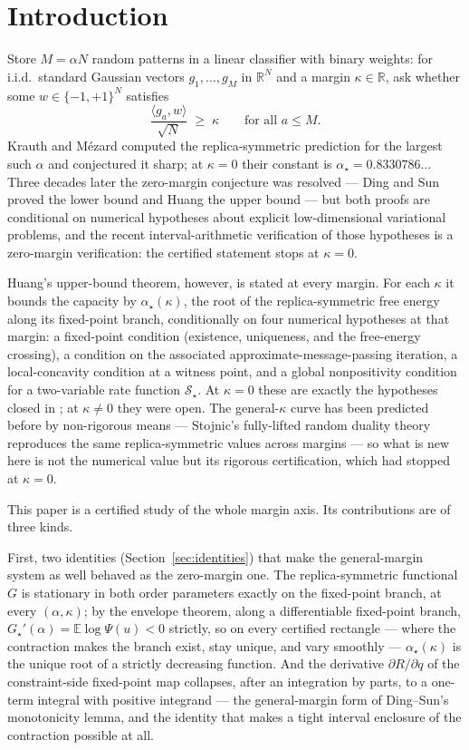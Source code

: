 \documentclass[11pt]{article}
\theoremstyle{remark}
\newcommand{\E}{\mathbb{E}}
\newcommand{\R}{\mathbb{R}}
\newcommand{\sS}{\mathcal{S}}
\begin{document}
\section{Introduction}

Store $M=\alpha N$ random patterns in a linear classifier with binary
weights: for i.i.d.\ standard Gaussian vectors $g_1,\dots,g_M$ in
$\R^N$ and a margin $\kappa\in\R$, ask whether some
$w\in\{-1,+1\}^N$ satisfies
\[
\frac{\langle g_a, w\rangle}{\sqrt N}\;\ge\;\kappa
\qquad\text{for all } a\le M .
\]
Krauth and M\'ezard \cite{krauth1989storage} computed the
replica-symmetric prediction for the largest such $\alpha$ and
conjectured it sharp; at $\kappa=0$ their constant is
$\alpha_\star=0.8330786\ldots$  Three decades later the zero-margin
conjecture was resolved --- Ding and Sun \cite{ding2019capacity}
proved the lower bound and Huang \cite{huang2024capacity} the upper
bound --- but both proofs are conditional on numerical hypotheses
about explicit low-dimensional variational problems, and the recent
interval-arithmetic verification of those hypotheses
\cite{shmalo2026capacity} is a zero-margin verification: the certified
statement stops at $\kappa=0$.

Huang's upper-bound theorem, however, is stated at every margin.  For
each $\kappa$ it bounds the capacity by $\alpha_\star(\kappa)$, the
root of the replica-symmetric free energy along its fixed-point
branch, conditionally on four numerical hypotheses at that margin: a
fixed-point condition (existence, uniqueness, and the free-energy
crossing), a condition on the associated approximate-message-passing
iteration, a local-concavity condition at a witness point, and a
global nonpositivity condition for a two-variable rate function
$\sS_\star$.  At $\kappa=0$ these are exactly the hypotheses closed in
\cite{shmalo2026capacity}; at $\kappa\ne0$ they were open.
The general-$\kappa$ curve has been predicted before by non-rigorous
means --- Stojnic's fully-lifted random duality
theory~\cite{stojnic2023} reproduces the same replica-symmetric
values across margins --- so what is new here is not the numerical
value but its rigorous certification, which had stopped at
$\kappa=0$.

This paper is a certified study of the whole margin axis.  Its
contributions are of three kinds.

First, two identities (Section~\ref{sec:identities}) that make the
general-margin system as well behaved as the zero-margin one.  The
replica-symmetric functional $G$ is stationary in both order
parameters exactly on the fixed-point branch, at every $(\alpha,
\kappa)$; by the envelope theorem, along a differentiable fixed-point
branch, $G_\star'(\alpha)=\E\log\Psi(u)<0$ strictly, so on every
certified rectangle --- where the contraction makes the branch exist,
stay unique, and vary smoothly --- $\alpha_\star(\kappa)$ is the
unique root of a strictly decreasing function.  And the derivative $\partial R/\partial
q$ of the constraint-side fixed-point map collapses, after an
integration by parts, to a one-term integral with positive integrand
--- the general-margin form of Ding--Sun's monotonicity lemma, and the
identity that makes a tight interval enclosure of the contraction
possible at all.
\end{document}
